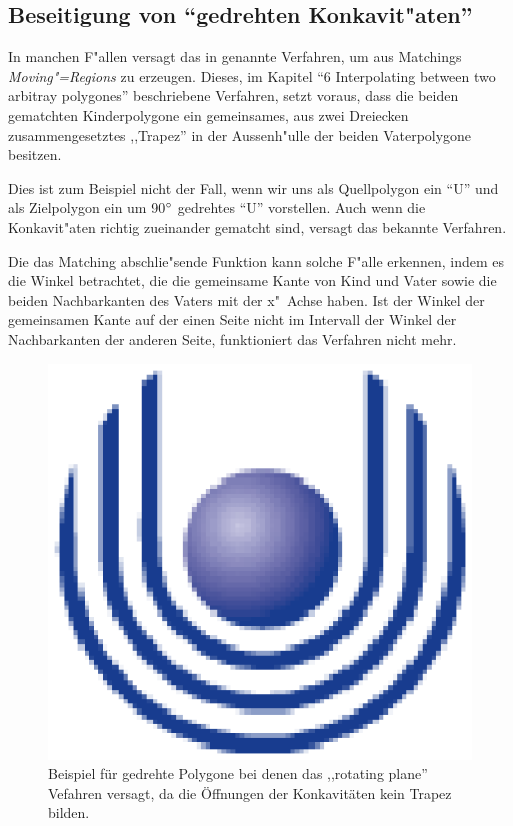 \subsection{Beseitigung von "`gedrehten Konkavit"aten"'}\label{gedrehtKon}
In manchen F"allen versagt das in \cite{TG} genannte Verfahren, um aus Matchings \textit{Moving"=Regions} zu erzeugen. Dieses, im Kapitel "`6 Interpolating between two arbitray polygones"' beschriebene Verfahren, setzt voraus, dass die beiden gematchten Kinderpolygone ein gemeinsames, aus zwei Dreiecken zusammengesetztes ,,Trapez'' in der Aussenh"ulle der beiden Vaterpolygone besitzen. 

Dies ist zum Beispiel nicht der Fall, wenn wir uns als Quellpolygon ein "`U"' und als Zielpolygon ein um 90$\degree$ gedrehtes "`U"' vorstellen. Auch wenn die Konkavit"aten richtig zueinander gematcht sind, versagt das bekannte Verfahren.

Die das Matching abschlie"sende Funktion kann solche F"alle erkennen, indem es die Winkel betrachtet, die die gemeinsame Kante von Kind und Vater sowie die beiden Nachbarkanten des Vaters mit der x"~Achse haben. Ist der Winkel der gemeinsamen Kante auf der einen Seite nicht im  Intervall der Winkel der Nachbarkanten der anderen Seite, funktioniert das Verfahren nicht mehr.

\begin{figure}
	\centering
	\includegraphics{feu_logo2.eps}
	\caption[Beispiel für gedrehte Polygone]{Beispiel für gedrehte Polygone bei denen das ,,rotating plane'' Vefahren versagt, da die Öffnungen der Konkavitäten kein Trapez bilden.}
	\label{fig:gedrehteMatches}
\end{figure}


